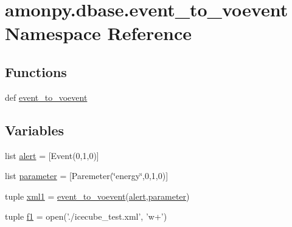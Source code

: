 \hypertarget{namespaceamonpy_1_1dbase_1_1event__to__voevent}{\section{amonpy.\-dbase.\-event\-\_\-to\-\_\-voevent Namespace Reference}
\label{namespaceamonpy_1_1dbase_1_1event__to__voevent}
}
\subsection*{Functions}
\begin{DoxyCompactItemize}
\item 
def \hyperlink{namespaceamonpy_1_1dbase_1_1event__to__voevent_a2f178698f8449f78e49f9790b3a03ef6}{event\-\_\-to\-\_\-voevent}
\end{DoxyCompactItemize}
\subsection*{Variables}
\begin{DoxyCompactItemize}
\item 
list \hyperlink{namespaceamonpy_1_1dbase_1_1event__to__voevent_af18d1f254a71c0b995ce6157afc2e83f}{alert} = \mbox{[}Event(0,1,0)\mbox{]}
\item 
list \hyperlink{namespaceamonpy_1_1dbase_1_1event__to__voevent_aa8180682dfe74a764c3804656183d081}{parameter} = \mbox{[}Paremeter(\char`\"{}energy\char`\"{},0,1,0)\mbox{]}
\item 
tuple \hyperlink{namespaceamonpy_1_1dbase_1_1event__to__voevent_ac83aa72b938b72eeadd9492ef63e72e2}{xml1} = \hyperlink{namespaceamonpy_1_1dbase_1_1event__to__voevent_a2f178698f8449f78e49f9790b3a03ef6}{event\-\_\-to\-\_\-voevent}(\hyperlink{namespaceamonpy_1_1dbase_1_1event__to__voevent_af18d1f254a71c0b995ce6157afc2e83f}{alert},\hyperlink{namespaceamonpy_1_1dbase_1_1event__to__voevent_aa8180682dfe74a764c3804656183d081}{parameter})
\item 
tuple \hyperlink{namespaceamonpy_1_1dbase_1_1event__to__voevent_a53fa982747642d3a0a3ea13ba8547b10}{f1} = open('./icecube\-\_\-test.\-xml', 'w+')
\end{DoxyCompactItemize}


